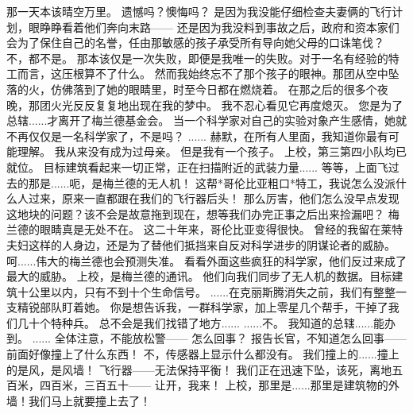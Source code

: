 \documentclass[openany]{book}
\begin{document}
\begin{dialogue}
     那一天本该晴空万里。
     遗憾吗？懊悔吗？
     是因为我没能仔细检查夫妻俩的飞行计划，眼睁睁看着他们奔向末路——
     还是因为我没料到事故之后，政府和资本家们会为了保住自己的名誉，任由那敏感的孩子承受所有导向她父母的口诛笔伐？
     不，都不是。
     那本该仅是一次失败，即便是我唯一的失败。对于一名有经验的特工而言，这压根算不了什么。
     然而我始终忘不了那个孩子的眼神。那团从空中坠落的火，仿佛落到了她的眼睛里，时至今日都在燃烧着。
     在那之后的很多个夜晚，那团火光反反复复地出现在我的梦中。
     我不忍心看见它再度熄灭。
     您是为了总辖......才离开了梅兰德基金会。
     当一个科学家对自己的实验对象产生感情，她就不再仅仅是一名科学家了，不是吗？
     ......
     赫默，在所有人里面，我知道你最有可能理解。
     我从来没有成为过母亲。
     但是我有一个孩子。
     上校，第三第四小队均已就位。
     目标建筑看起来一切正常，正在扫描附近的武装力量......
     等等，上面飞过去的那是......呃，是梅兰德的无人机！
     这帮*哥伦比亚粗口*特工，我说怎么没派什么人过来，原来一直都跟在我们的飞行器后头！
     那么厉害，他们怎么没早点发现这地块的问题？该不会是故意拖到现在，想等我们办完正事之后出来捡漏吧？
     梅兰德的眼睛真是无处不在。
     这二十年来，哥伦比亚变得很快。
     曾经的我留在莱特夫妇这样的人身边，还是为了替他们抵挡来自反对科学进步的阴谋论者的威胁。
     呵......伟大的梅兰德也会预测失准。
     看看外面这些疯狂的科学家，他们反过来成了最大的威胁。
     上校，是梅兰德的通讯。
     他们向我们同步了无人机的数据。目标建筑十公里以内，只有不到十个生命信号。
     ......在克丽斯腾消失之前，我们有整整一支精锐部队盯着她。
     你是想告诉我，一群科学家，加上零星几个帮手，干掉了我们几十个特种兵。
     总不会是我们找错了地方......
     ......不。
     我知道的总辖......能办到。
     ......
     全体注意，不能放松警——
     怎么回事？
     报告长官，不知道怎么回事——前面好像撞上了什么东西！
     不，传感器上显示什么都没有。
     我们撞上的......撞上的是风，是风墙！
     飞行器——无法保持平衡！
     我们正在迅速下坠，该死，离地五百米，四百米，三百五十——
     让开，我来！
     上校，那里是......那里是建筑物的外墙！我们马上就要撞上去了！

\end{dialogue}
\end{document}
